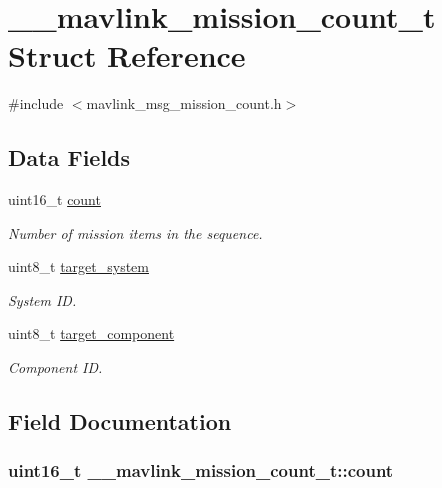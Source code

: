 \hypertarget{struct____mavlink__mission__count__t}{\section{\+\_\+\+\_\+mavlink\+\_\+mission\+\_\+count\+\_\+t Struct Reference}
\label{struct____mavlink__mission__count__t}
}


{\ttfamily \#include $<$mavlink\+\_\+msg\+\_\+mission\+\_\+count.\+h$>$}

\subsection*{Data Fields}
\begin{DoxyCompactItemize}
\item 
uint16\+\_\+t \hyperlink{struct____mavlink__mission__count__t_ae0f07b1c9ffca95b6c76cde724eda5d9}{count}
\begin{DoxyCompactList}\small\item\em Number of mission items in the sequence. \end{DoxyCompactList}\item 
uint8\+\_\+t \hyperlink{struct____mavlink__mission__count__t_a9e211af96b9dd62f71c32fb3412dbfca}{target\+\_\+system}
\begin{DoxyCompactList}\small\item\em System I\+D. \end{DoxyCompactList}\item 
uint8\+\_\+t \hyperlink{struct____mavlink__mission__count__t_a21576207ae6595d5272a405fb8c198bf}{target\+\_\+component}
\begin{DoxyCompactList}\small\item\em Component I\+D. \end{DoxyCompactList}\end{DoxyCompactItemize}


\subsection{Field Documentation}
\hypertarget{struct____mavlink__mission__count__t_ae0f07b1c9ffca95b6c76cde724eda5d9}{
\subsubsection[{count}]{\setlength{\rightskip}{0pt plus 5cm}uint16\+\_\+t \+\_\+\+\_\+mavlink\+\_\+mission\+\_\+count\+\_\+t\+::count}}\label{struct____mavlink__mission__count__t_ae0f07b1c9ffca95b6c76cde724eda5d9}


